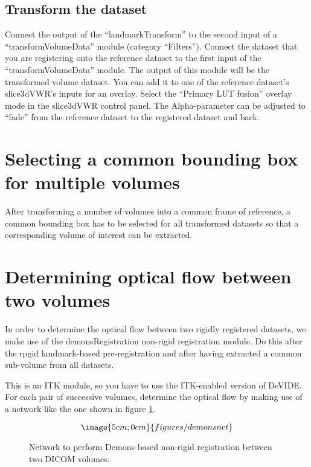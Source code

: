 \subsection{Transform the dataset}
Connect the output of the ``landmarkTransform'' to the second input of
a ``transformVolumeData'' module (category ``Filters'').  Connect the
dataset that you are registering onto the reference dataset to the
first input of the ``transformVolumeData'' module.  The output of this
module will be the transformed volume dataset.  You can add it to one
of the reference dataset's slice3dVWR's inputs for an overlay.  Select
the ``Primary LUT fusion'' overlay mode in the slice3dVWR control
panel.  The Alpha-parameter can be adjusted to ``fade'' from the
reference dataset to the registered dataset and back.

\section{Selecting a common bounding box for multiple volumes}
After transforming a number of volumes into a common frame of
reference, a common bounding box has to be selected for all
transformed datasets so that a corresponding volume of interest can be
extracted.

\section{Determining optical flow between two volumes}
In order to determine the optical flow between two rigidly registered
datasets, we make use of the demonsRegistration non-rigid registration
module.  Do this after the rpgid landmark-based pre-registration and
after having extracted a common sub-volume from all datasets.

This is an ITK module, so you have to use the ITK-enabled version of
DeVIDE.  For each pair of successive volumes, determine the optical
flow by making use of a network like the one shown in figure
\ref{figdemons}.

\begin{figure}
$$\image{5cm;0cm}{figures/demonsnet}$$
\caption{Network to perform Demons-based non-rigid registration between two 
DICOM volumes.}\label{figdemons}
\end{figure}




